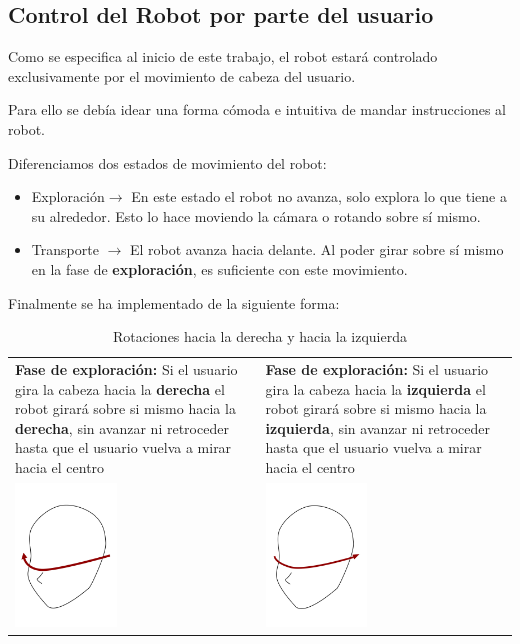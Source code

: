 \documentclass[twoside, 11pt]{epstfg}
\begin{document}
\subsection{Control del Robot por parte del usuario}\label{intCont}

Como se especifica al inicio de este trabajo, el robot estará controlado exclusivamente por el movimiento de cabeza del usuario.

Para ello se debía idear una forma cómoda e intuitiva de mandar instrucciones al robot.

Diferenciamos dos estados de movimiento del robot:
\begin{itemize}
	\item Exploración$\rightarrow$ En este estado el robot no avanza, solo explora lo que tiene a su alrededor. Esto lo hace moviendo la cámara o rotando sobre sí mismo.
	\item Transporte $\rightarrow$ El robot avanza hacia delante. Al poder girar sobre sí mismo en la fase de \textbf{exploración}, es suficiente con este movimiento.
\end{itemize}

Finalmente se ha implementado de la siguiente forma:



\begin{table}[H]
	\begin{tabular}{p{7.0cm}  p{7.0cm}}
		\textbf{Fase de exploración:} Si el usuario gira la cabeza hacia la \textbf{derecha} el robot girará sobre si mismo hacia la \textbf{derecha}, sin avanzar ni retroceder hasta que el usuario vuelva a mirar hacia el centro & \textbf{Fase de exploración:} Si el usuario gira la cabeza hacia la \textbf{izquierda} el robot girará sobre si mismo hacia la \textbf{izquierda}, sin avanzar ni retroceder hasta que el usuario vuelva a mirar hacia el centro \\ 
		\centering\includegraphics[height=1.5in]{images/movder.png} & \centering\includegraphics[height=1.5in]{images/movderbuena.png} \\
		
	\end{tabular}
	\caption{Rotaciones hacia la derecha y hacia la izquierda}
	\label{movRobotRot}
\end{table}
\end{document}
